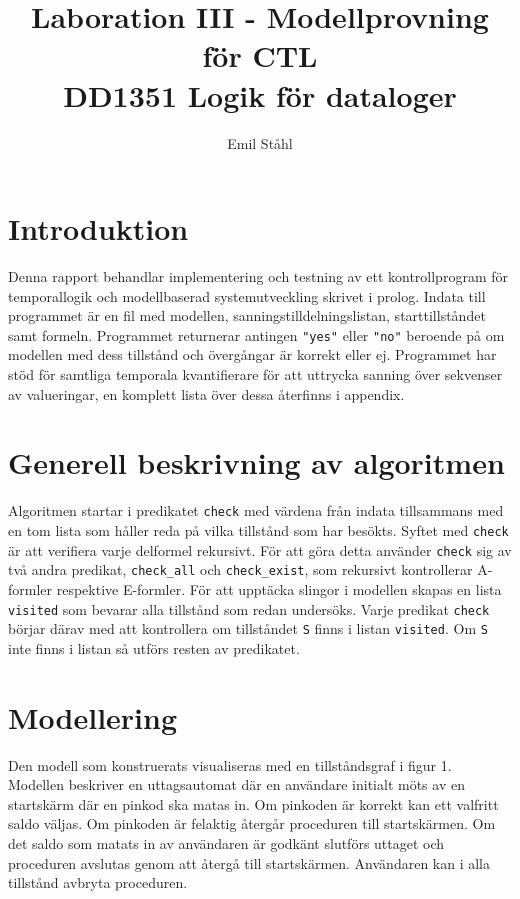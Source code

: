 \documentclass[]{article}
\title{Laboration III - Modellprovning för CTL \\ DD1351 Logik för dataloger }
\author{Emil Ståhl}
\begin{document}
\setlength\parindent{0pt}
\maketitle

\section{Introduktion}
Denna rapport behandlar implementering och testning av ett kontrollprogram för temporallogik och modellbaserad systemutveckling skrivet i prolog. Indata till programmet är en fil med modellen, sanningstilldelningslistan, starttillståndet samt formeln. Programmet returnerar antingen \texttt{"yes"} eller \texttt{"no"} beroende på om modellen med dess tillstånd och övergångar är korrekt eller ej. Programmet har stöd för samtliga temporala kvantifierare för att uttrycka sanning över sekvenser av valueringar, en komplett lista över dessa återfinns i appendix. 

\section{Generell beskrivning av algoritmen}
Algoritmen startar i predikatet \texttt{check} med värdena från indata tillsammans med en tom lista som håller reda på vilka tillstånd som har besökts. Syftet med \texttt{check} är att verifiera varje delformel rekursivt. För att göra detta använder \texttt{check} sig av två andra predikat, \texttt{check\_all} och \texttt{check\_exist}, som rekursivt kontrollerar A-formler respektive E-formler. För att upptäcka slingor i modellen skapas en lista  \texttt{visited} som bevarar alla tillstånd som redan undersöks. Varje predikat \texttt{check} börjar därav med att kontrollera om tillståndet  \texttt{S} finns i listan  \texttt{visited}. Om \texttt{S} inte finns i listan så utförs resten av predikatet.

\section{Modellering}
Den modell som konstruerats visualiseras med en tillståndsgraf i figur 1. Modellen beskriver en uttagsautomat där en användare initialt möts av en startskärm där en pinkod ska matas in. Om pinkoden är korrekt kan ett valfritt saldo väljas. Om pinkoden är felaktig återgår proceduren till startskärmen. Om det saldo som matats in av användaren är godkänt slutförs uttaget och proceduren avslutas genom att återgå till startskärmen. Användaren kan i alla tillstånd avbryta proceduren.
\end{document}
